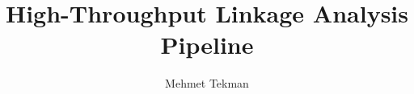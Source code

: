 \documentclass[11pt]{report} %
\author{Mehmet Tekman}
\title{High-Throughput Linkage Analysis Pipeline}
\begin{document}
\maketitle 

\begin{spacing}{1}
\tableofcontents
\end{spacing}

%
%




%





\end{document}
